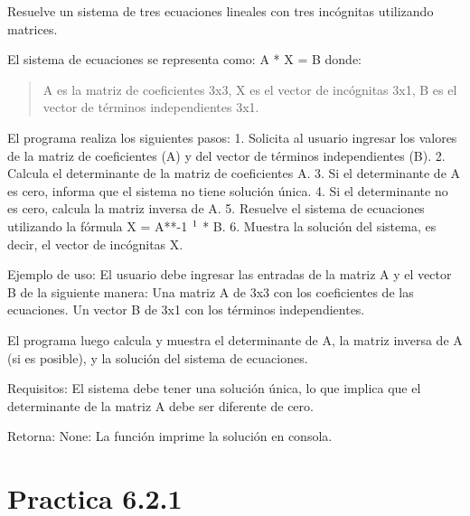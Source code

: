 \documentclass[letterpaper,10pt,spanish]{sphinxmanual}
\begin{document}
\begin{fulllineitems}
\label{\detokenize{pr6:pr6.1_7.resolver_sistema_ecuaciones}}
\pysigstartsignatures
{}
\pysigstopsignatures
\sphinxAtStartPar
Resuelve un sistema de tres ecuaciones lineales con tres incógnitas utilizando matrices.

\sphinxAtStartPar
El sistema de ecuaciones se representa como:
A * X = B
donde:
\begin{quote}

\sphinxAtStartPar
A es la matriz de coeficientes 3x3,
X es el vector de incógnitas 3x1,
B es el vector de términos independientes 3x1.
\end{quote}

\sphinxAtStartPar
El programa realiza los siguientes pasos:
1. Solicita al usuario ingresar los valores de la matriz de coeficientes (A) y del vector de términos independientes (B).
2. Calcula el determinante de la matriz de coeficientes A.
3. Si el determinante de A es cero, informa que el sistema no tiene solución única.
4. Si el determinante no es cero, calcula la matriz inversa de A.
5. Resuelve el sistema de ecuaciones utilizando la fórmula X = A**-1 \(\sp{\text{1}}\) * B.
6. Muestra la solución del sistema, es decir, el vector de incógnitas X.

\sphinxAtStartPar
Ejemplo de uso:
El usuario debe ingresar las entradas de la matriz A y el vector B de la siguiente manera:
\sphinxhyphen{} Una matriz A de 3x3 con los coeficientes de las ecuaciones.
\sphinxhyphen{} Un vector B de 3x1 con los términos independientes.

\sphinxAtStartPar
El programa luego calcula y muestra el determinante de A, la matriz inversa de A (si es posible), y la solución del sistema de ecuaciones.

\sphinxAtStartPar
Requisitos:
\sphinxhyphen{} El sistema debe tener una solución única, lo que implica que el determinante de la matriz A debe ser diferente de cero.

\sphinxAtStartPar
Retorna:
None: La función imprime la solución en consola.

\end{fulllineitems}



\section{Practica 6.2.1}
\label{\detokenize{pr6:module-pr6.2_1}}\label{\detokenize{pr6:practica-6-2-1}}
\end{document}
